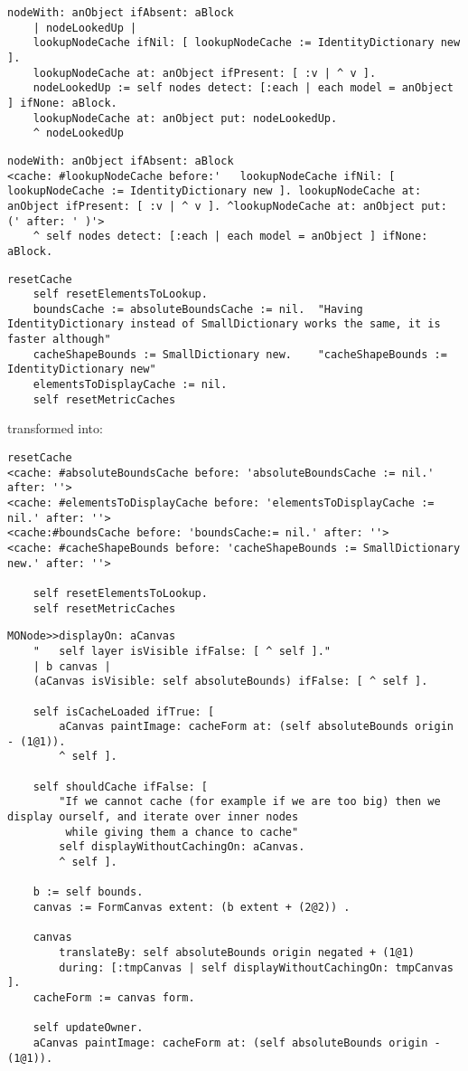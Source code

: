 \documentclass[runningheads]{llncs}
\begin{document}
\begin{lstlisting}
nodeWith: anObject ifAbsent: aBlock 
	| nodeLookedUp |
	lookupNodeCache ifNil: [ lookupNodeCache := IdentityDictionary new ].
	lookupNodeCache at: anObject ifPresent: [ :v | ^ v ].
	nodeLookedUp := self nodes detect: [:each | each model = anObject ] ifNone: aBlock.
	lookupNodeCache at: anObject put: nodeLookedUp.
	^ nodeLookedUp
\end{lstlisting}

\begin{lstlisting}
nodeWith: anObject ifAbsent: aBlock 
<cache: #lookupNodeCache before:'	lookupNodeCache ifNil: [ lookupNodeCache := IdentityDictionary new ]. lookupNodeCache at: anObject ifPresent: [ :v | ^ v ]. ^lookupNodeCache at: anObject put: (' after: ' )'>
	^ self nodes detect: [:each | each model = anObject ] ifNone: aBlock.
\end{lstlisting}


\begin{lstlisting}
resetCache
	self resetElementsToLookup.
	boundsCache := absoluteBoundsCache := nil.	"Having IdentityDictionary instead of SmallDictionary works the same, it is faster although"
	cacheShapeBounds := SmallDictionary new.	"cacheShapeBounds := IdentityDictionary new"
	elementsToDisplayCache := nil.
	self resetMetricCaches
\end{lstlisting}
transformed into:
\begin{lstlisting}
resetCache
<cache: #absoluteBoundsCache before: 'absoluteBoundsCache := nil.' after: ''> 
<cache: #elementsToDisplayCache before: 'elementsToDisplayCache := nil.' after: ''> 
<cache:#boundsCache before: 'boundsCache:= nil.' after: ''> 
<cache: #cacheShapeBounds before: 'cacheShapeBounds := SmallDictionary new.' after: ''>

	self resetElementsToLookup.
	self resetMetricCaches
\end{lstlisting}

\begin{lstlisting}
MONode>>displayOn: aCanvas 
	"	self layer isVisible ifFalse: [ ^ self ]."	
	| b canvas |
	(aCanvas isVisible: self absoluteBounds) ifFalse: [ ^ self ].

	self isCacheLoaded ifTrue: [
		aCanvas paintImage: cacheForm at: (self absoluteBounds origin - (1@1)).
		^ self ].
	
	self shouldCache ifFalse: [ 
		"If we cannot cache (for example if we are too big) then we display ourself, and iterate over inner nodes
		 while giving them a chance to cache"
		self displayWithoutCachingOn: aCanvas.
		^ self ].	
	
	b := self bounds.	
	canvas := FormCanvas extent: (b extent + (2@2)) .

	canvas 
		translateBy: self absoluteBounds origin negated + (1@1) 
		during: [:tmpCanvas | self displayWithoutCachingOn: tmpCanvas ].
	cacheForm := canvas form.	

	self updateOwner. 
	aCanvas paintImage: cacheForm at: (self absoluteBounds origin - (1@1)).
\end{lstlisting}
\end{document}

